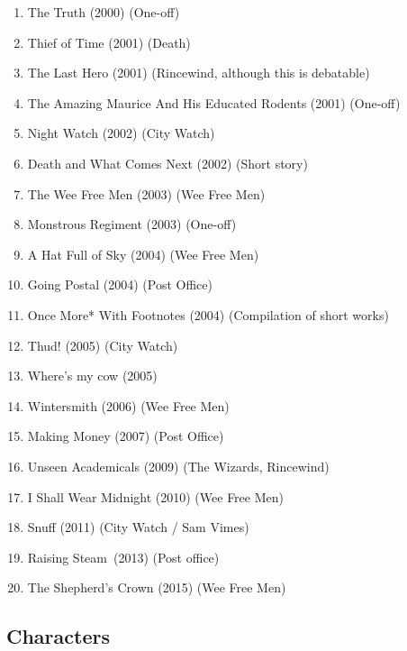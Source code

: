 \begin{enumerate}[topsep=0pt, partopsep=0pt,itemsep=2pt,parsep=2pt]
\item{The Truth (2000) (One-off) }
\item{Thief of Time (2001) (Death) }
\item{The Last Hero (2001) (Rincewind, although this is debatable) }
\item{The Amazing Maurice And His Educated Rodents (2001) (One-off) }
\item{Night Watch (2002) (City Watch) }
\item{Death and What Comes Next (2002) (Short story) }
\item{The Wee Free Men (2003) (Wee Free Men) }
\item{Monstrous Regiment (2003) (One-off) }
\item{A Hat Full of Sky (2004) (Wee Free Men) }
\item{Going Postal (2004) (Post Office) }
\item{Once More* With Footnotes (2004) (Compilation of short works) }
\item{Thud! (2005) (City Watch) }
\item{Where's my cow (2005) }
\item{Wintersmith (2006) (Wee Free Men) }
\item{Making Money (2007) (Post Office) }
\item{Unseen Academicals (2009) (The Wizards, Rincewind)}
\item{I Shall Wear Midnight (2010) (Wee Free Men)}
\item{Snuff (2011) (City Watch / Sam Vimes)}
\item{Raising Steam (2013) (Post office)}
\item{The Shepherd's Crown (2015) (Wee Free Men)}
\end{enumerate}

\subsection{Characters}
